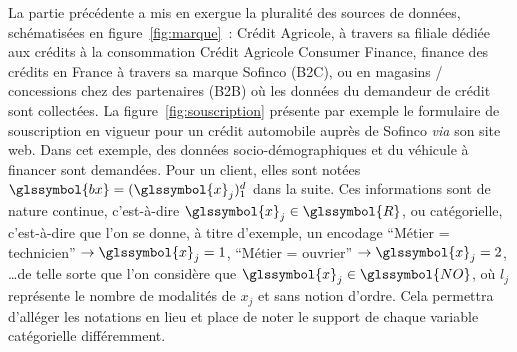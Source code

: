 La partie précédente a mis en exergue la pluralité des sources de données, schématisées en figure~\ref{fig:marque}~: Crédit Agricole, à travers sa filiale dédiée aux crédits à la consommation Crédit Agricole Consumer Finance, finance des crédits en France à travers sa marque Sofinco (B2C), ou en magasins / concessions chez des partenaires (B2B) où les données du demandeur de crédit sont collectées. La figure~\ref{fig:souscription} présente par exemple le formulaire de souscription en vigueur pour un crédit automobile auprès de Sofinco \textit{via} son site web. Dans cet exemple, des données socio-démographiques et du véhicule à financer sont demandées. Pour un client, elles sont notées $\glssymbol{bx} = (\glssymbol{x}_j)_1^d$ dans la suite. Ces informations sont de nature continue, c'est-à-dire $\glssymbol{x}_j \in \glssymbol{R}$, ou catégorielle, c'est-à-dire que l'on se donne, à titre d'exemple, un encodage ``Métier = technicien'' $\rightarrow \glssymbol{x}_j = 1$, ``Métier = ouvrier'' $\rightarrow \glssymbol{x}_j = 2$, \dots de telle sorte que l'on considère que $\glssymbol{x}_j \in \glssymbol{NO}$, où $l_j$ représente le nombre de modalités de $x_j$ et sans notion d'ordre. Cela permettra d'alléger les notations en lieu et place de noter le support de chaque variable catégorielle différemment.

